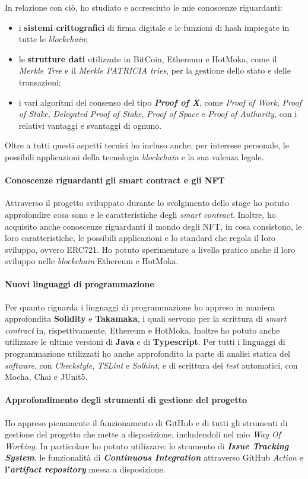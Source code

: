\noindent In relazione con ciò, ho studiato e accresciuto le mie conoscenze riguardanti: 
\begin{itemize}
  \item i \textbf{sistemi crittografici} di firma digitale e le funzioni di hash impiegate in tutte le \textit{blockchain};
  \item le \textbf{strutture dati} utilizzate in BitCoin, Ethereum e HotMoka, come il \textit{Merkle Tree} e il \textit{Merkle PATRICIA tries}, per la gestione dello stato e delle transazioni;
  \item i vari algoritmi del consenso del tipo \textbf{\textit{Proof of X}}, come \textit{Proof of Work}, \textit{Proof of Stake}, \textit{Delegated Proof of Stake}, \textit{Proof of Space} e \textit{Proof of Authority}, con i relativi vantaggi e svantaggi di ognuno.
\end{itemize}

Oltre a tutti questi aspetti tecnici ho incluso anche, per interesse personale, le possibili applicazioni della tecnologia \textit{blockchain} e la sua valenza legale.

\paragraph{Conoscenze riguardanti gli smart contract e gli NFT}
Attraverso il progetto sviluppato durante lo svolgimento dello stage ho potuto approfondire cosa sono e le caratteristiche degli \textit{smart contract}. Inoltre, ho acquisito anche conoscenze riguardanti il mondo degli NFT, in cosa consistono, le loro caratteristiche, le possibili applicazioni e lo standard che regola il loro sviluppo, ovvero ERC721. Ho potuto sperimentare a livello pratico anche il loro sviluppo nelle \textit{blockchain} Ethereum e HotMoka.

\paragraph{Nuovi linguaggi di programmazione}
Per quanto riguarda i linguaggi di programmazione ho appreso in maniera approfondita \textbf{Solidity} e \textbf{Takamaka}, i quali servono per la scrittura di \textit{smart contract} in, rispettivamente, Ethereum e HotMoka. Inoltre ho potuto anche utilizzare le ultime versioni di \textbf{Java} e di \textbf{Typescript}.
Per tutti i linguaggi di programmazione utilizzati ho anche approfondito la parte di analisi statica del \textit{software}, con \textit{Checkstyle}, \textit{TSLint} e \textit{Solhint}, e di scrittura dei \textit{test} automatici, con Mocha, Chai e JUnit5.

\paragraph{Approfondimento degli strumenti di gestione del progetto}
Ho appreso pienamente il funzionamento di GitHub e di tutti gli strumenti di gestione del progetto che mette a disposizione, includendoli nel mio \textit{Way Of Working}. In particolare ho potuto utilizzare: lo strumento di \textbf{\textit{Issue Tracking System}}, le funzionalità di \textbf{\textit{Continuous Integration}} attraverso GitHub \textit{Action} e \textbf{l'\textit{artifact repository}} messa a disposizione.
